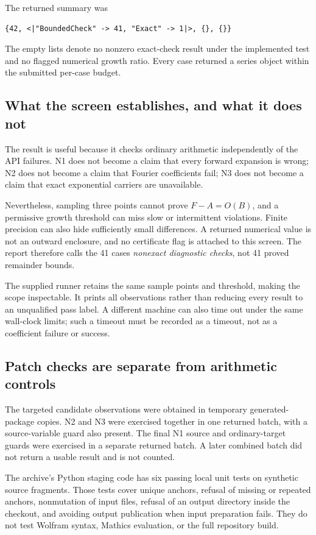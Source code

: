 \documentclass[11pt,letterpaper]{article}
\begin{document}
The returned summary was
\begin{lstlisting}
{42, <|"BoundedCheck" -> 41, "Exact" -> 1|>, {}, {}}
\end{lstlisting}
The empty lists denote no nonzero exact-check result under the implemented test and no flagged numerical growth ratio. Every case returned a series object within the submitted per-case budget.

\subsection{What the screen establishes, and what it does not}

The result is useful because it checks ordinary arithmetic independently of the API failures. N1 does not become a claim that every forward expansion is wrong; N2 does not become a claim that Fourier coefficients fail; N3 does not become a claim that exact exponential carriers are unavailable.

Nevertheless, sampling three points cannot prove $F-A=O(B)$, and a permissive growth threshold can miss slow or intermittent violations. Finite precision can also hide sufficiently small differences. A returned numerical value is not an outward enclosure, and no certificate flag is attached to this screen. The report therefore calls the 41 cases \emph{nonexact diagnostic checks}, not 41 proved remainder bounds.

The supplied runner retains the same sample points and threshold, making the scope inspectable. It prints all observations rather than reducing every result to an unqualified pass label. A different machine can also time out under the same wall-clock limits; such a timeout must be recorded as a timeout, not as a coefficient failure or success.

\subsection{Patch checks are separate from arithmetic controls}

The targeted candidate observations were obtained in temporary generated-package copies. N2 and N3 were exercised together in one returned batch, with a source-variable guard also present. The final N1 source and ordinary-target guards were exercised in a separate returned batch. A later combined batch did not return a usable result and is not counted.

The archive's Python staging code has six passing local unit tests on synthetic source fragments. Those tests cover unique anchors, refusal of missing or repeated anchors, nonmutation of input files, refusal of an output directory inside the checkout, and avoiding output publication when input preparation fails. They do not test Wolfram syntax, Mathics evaluation, or the full repository build.
\end{document}
